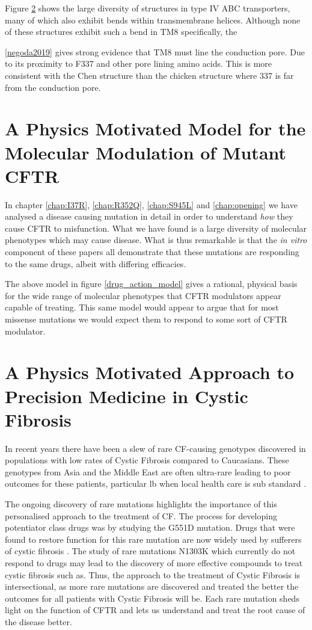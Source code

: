 Figure \ref{} shows the large diversity of structures in type IV ABC transporters, many of which also exhibit bends within transmembrane helices\cite{thomas2020}. Although none of these structures exhibit such a bend in TM8 specifically, the 

\ref{negoda2019} gives strong evidence that TM8 must line the conduction pore. Due to its proximity to F337 and other pore lining amino acids. This is more consistent with the Chen structure than the chicken structure where 337 is far from the conduction pore.

\section{A Physics Motivated Model for the Molecular Modulation of Mutant CFTR }
In chapter \ref{chap:I37R}, \ref{chap:R352Q}, \ref{chap:S945L} and \ref{chap:opening} we have analysed a disease causing mutation in detail in order to understand \textit{how} they cause CFTR to misfunction. What we have found is a large diversity of molecular phenotypes which may cause disease. What is thus remarkable is that the \textit{in vitro} component of these papers all demonstrate that these mutations are responding to the same drugs, albeit with differing efficacies.



The above model in figure \ref{drug_action_model} gives a rational, physical basis for the wide range of molecular phenotypes that CFTR modulators appear capable of treating. This same model would appear to argue that for most missense mutations we would expect them to respond to some sort of CFTR modulator.

\section{A Physics Motivated Approach to Precision Medicine in Cystic Fibrosis}


In recent years there have been a slew of rare CF-causing genotypes discovered in populations with low rates of Cystic Fibrosis compared to Caucasians. These genotypes from Asia and the Middle East are often ultra-rare leading to poor outcomes for these patients, particular lb when local health care is sub standard \cite{}. 

The ongoing discovery of rare mutations highlights the importance of this personalised approach to the treatment of CF. The process for developing potentiator class drugs was by studying the G551D mutation. Drugs that were found to restore function for this rare mutation are now widely used by sufferers of cystic fibrosis \cite{}. The study of rare mutations N1303K which currently do not respond to drugs may lead to the discovery of more effective compounds to treat cystic fibrosis such as. Thus, the approach to the treatment of Cystic Fibrosis is intersectional, as more rare mutations are discovered and treated the better the outcomes for all patients with Cystic Fibrosis will be. Each rare mutation sheds light on the function of CFTR and lets us understand and treat the root cause of the disease better.


